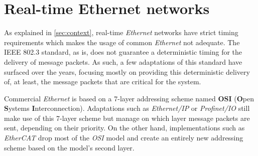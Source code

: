 \section{Real-time Ethernet networks}\label{sec:rt-networks}

As explained in \autoref{sec:context}, real-time \emph{Ethernet} networks have strict timing requirements which makes the usage of common \emph{Ethernet} not adequate.
The IEEE 802.3 standard, as is, does not guarantee a deterministic timing for the delivery of message packets.
As such, a few adaptations of this standard have surfaced over the years, focusing mostly on providing this deterministic delivery of, at least, the message packets that are critical for the system.

Commercial \emph{Ethernet} is based on a 7-layer addressing scheme named \textbf{OSI} (\textbf Open \textbf Systems \textbf Interconnection).
Adaptations such as \emph{Ethernet/IP} or \emph{Profinet/IO} still make use of this 7-layer scheme but manage on which layer message packets are sent, depending on their priority.
On the other hand, implementations such as \emph{EtherCAT} drop most of the \emph{OSI} model and create an entirely new addressing scheme based on the model's second layer.

